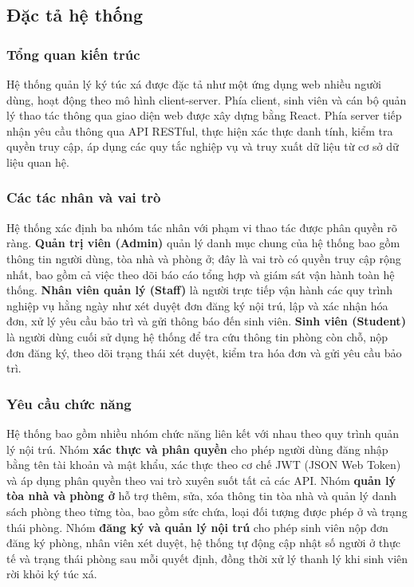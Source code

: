 \documentclass[13pt,a4paper]{extarticle}
\numberwithin{figure}{section}
\numberwithin{table}{section}
\begin{document}
	\subsection{Đặc tả hệ thống}
	
	\subsubsection{Tổng quan kiến trúc}
	
	Hệ thống quản lý ký túc xá được đặc tả như một ứng dụng web nhiều người dùng, hoạt động theo mô hình client-server. Phía client, sinh viên và cán bộ quản lý thao tác thông qua giao diện web được xây dựng bằng React. Phía server tiếp nhận yêu cầu thông qua API RESTful, thực hiện xác thực danh tính, kiểm tra quyền truy cập, áp dụng các quy tắc nghiệp vụ và truy xuất dữ liệu từ cơ sở dữ liệu quan hệ.
	
	\subsubsection{Các tác nhân và vai trò}
	
	Hệ thống xác định ba nhóm tác nhân với phạm vi thao tác được phân quyền rõ ràng. \textbf{Quản trị viên (Admin)} quản lý danh mục chung của hệ thống bao gồm thông tin người dùng, tòa nhà và phòng ở; đây là vai trò có quyền truy cập rộng nhất, bao gồm cả việc theo dõi báo cáo tổng hợp và giám sát vận hành toàn hệ thống. \textbf{Nhân viên quản lý (Staff)} là người trực tiếp vận hành các quy trình nghiệp vụ hằng ngày như xét duyệt đơn đăng ký nội trú, lập và xác nhận hóa đơn, xử lý yêu cầu bảo trì và gửi thông báo đến sinh viên. \textbf{Sinh viên (Student)} là người dùng cuối sử dụng hệ thống để tra cứu thông tin phòng còn chỗ, nộp đơn đăng ký, theo dõi trạng thái xét duyệt, kiểm tra hóa đơn và gửi yêu cầu bảo trì.
	
	\subsubsection{Yêu cầu chức năng}
	
	Hệ thống bao gồm nhiều nhóm chức năng liên kết với nhau theo quy trình quản lý nội trú. Nhóm \textbf{xác thực và phân quyền} cho phép người dùng đăng nhập bằng tên tài khoản và mật khẩu, xác thực theo cơ chế JWT (JSON Web Token) và áp dụng phân quyền theo vai trò xuyên suốt tất cả các API. Nhóm \textbf{quản lý tòa nhà và phòng ở} hỗ trợ thêm, sửa, xóa thông tin tòa nhà và quản lý danh sách phòng theo từng tòa, bao gồm sức chứa, loại đối tượng được phép ở và trạng thái phòng. Nhóm \textbf{đăng ký và quản lý nội trú} cho phép sinh viên nộp đơn đăng ký phòng, nhân viên xét duyệt, hệ thống tự động cập nhật số người ở thực tế và trạng thái phòng sau mỗi quyết định, đồng thời xử lý thanh lý khi sinh viên rời khỏi ký túc xá.
	
\end{document}

